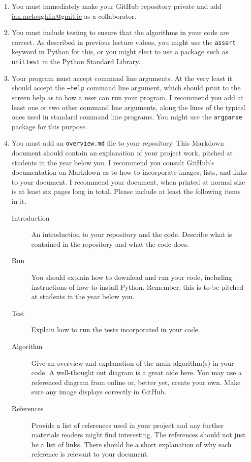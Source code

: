 \documentclass[12pt, a4paper]{article}
\begin{document}
\begin{enumerate}
  \item You must immediately make your GitHub repository private and add \url{ian.mcloughlin@gmit.ie} as a collaborator.
  \item You must include testing to ensure that the algorithms in your code are correct. As described in previous lecture videos, you might use the \texttt{assert} keyword in Python for this, or you might elect to use a package such as \texttt{unittest} in the Python Standard Library.
  \item Your program must accept command line arguments. At the very least it should accept the \texttt{--help} command line argument, which should print to the screen help as to how a user can run your program. I recommend you add at least one or two other command line arguments, along the lines of the typical ones used in standard command line programs. You might use the \texttt{argparse} package for this purpose.
  \item You must add an \texttt{overview.md} file to your repository. This Markdown document should contain an explanation of your project work, pitched at students in the year below you. I recommend you consult GitHub's documentation on Markdown as to how to incorporate images, lists, and links to your document. I recommend your document, when printed at normal size is at least six pages long in total. Please include at least the following items in it.
  \begin{description}
    \item[Introduction] An introduction to your repository and the code. Describe what is contained in the repository and what the code does.
    \item[Run] You should explain how to download and run your code, including instructions of how to install Python. Remember, this is to be pitched at students in the year below you.
    \item[Test] Explain how to run the tests incorporated in your code.
    \item[Algorithm] Give an overview and explanation of the main algorithm(s) in your code. A well-thought out diagram is a great aide here. You may use a referenced diagram from online or, better yet, create your own. Make sure any image displays correctly in GitHub.
    \item[References] Provide a list of references used in your project and any further materials readers might find interesting. The references should not just be a list of links. There should be a short explanation of why each reference is relevant to your document.
  \end{description}
\end{enumerate}
\end{document}
